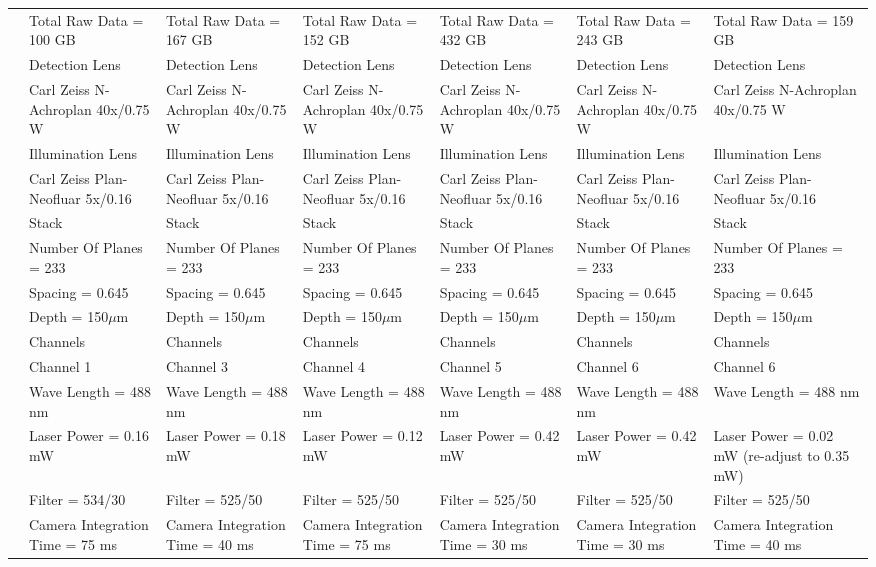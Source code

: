 \documentclass[11pt,a4paper, final]{article}
\begin{document}
\begin{longtable}{@{} l l l l l l l @{}}
& Total Raw Data = 100 GB & Total Raw Data = 167 GB & Total Raw Data = 152 GB & Total Raw Data = 432 GB & Total Raw Data = 243 GB & Total Raw Data = 159 GB\\
& Detection Lens & Detection Lens & Detection Lens & Detection Lens & Detection Lens & Detection Lens\\
& Carl Zeiss N-Achroplan 40x/0.75 W & Carl Zeiss N-Achroplan 40x/0.75 W & Carl Zeiss N-Achroplan 40x/0.75 W & Carl Zeiss N-Achroplan 40x/0.75 W & Carl Zeiss N-Achroplan 40x/0.75 W & Carl Zeiss N-Achroplan 40x/0.75 W\\
& Illumination Lens & Illumination Lens & Illumination Lens & Illumination Lens & Illumination Lens & Illumination Lens\\
& Carl Zeiss Plan-Neofluar 5x/0.16 & Carl Zeiss Plan-Neofluar 5x/0.16 & Carl Zeiss Plan-Neofluar 5x/0.16 & Carl Zeiss Plan-Neofluar 5x/0.16 & Carl Zeiss Plan-Neofluar 5x/0.16 & Carl Zeiss Plan-Neofluar 5x/0.16\\
& Stack & Stack & Stack & Stack & Stack & Stack\\
& Number Of Planes = 233 & Number Of Planes = 233 & Number Of Planes = 233 & Number Of Planes = 233 & Number Of Planes = 233 & Number Of Planes = 233\\
& Spacing = 0.645 & Spacing = 0.645 & Spacing = 0.645 & Spacing = 0.645 & Spacing = 0.645 & Spacing = 0.645\\
& Depth = 150$\mu$m & Depth = 150$\mu$m & Depth = 150$\mu$m & Depth = 150$\mu$m & Depth = 150$\mu$m & Depth = 150$\mu$m\\
& Channels & Channels & Channels & Channels & Channels & Channels\\
& Channel 1 & Channel 3 & Channel 4 & Channel 5 & Channel 6 & Channel 6\\
& Wave Length = 488 nm & Wave Length = 488 nm & Wave Length = 488 nm & Wave Length = 488 nm & Wave Length = 488 nm & Wave Length = 488 nm\\
& Laser Power = 0.16 mW & Laser Power = 0.18 mW & Laser Power = 0.12 mW & Laser Power = 0.42 mW & Laser Power = 0.42 mW & Laser Power = 0.02 mW (re-adjust to 0.35 mW)\\
& Filter = 534/30 & Filter = 525/50 & Filter = 525/50 & Filter = 525/50 & Filter = 525/50 & Filter = 525/50\\
& Camera Integration Time = 75 ms & Camera Integration Time = 40 ms & Camera Integration Time = 75 ms & Camera Integration Time = 30 ms & Camera Integration Time = 30 ms & Camera Integration Time = 40 ms\\

\end{longtable}
\end{document}
